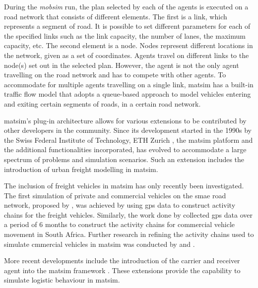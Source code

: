 During the \textit{mobsim} run, the plan selected by each of the agents is executed on a road network that consists of different elements. The first is a link, which represents a segment of road. It is possible to set different parameters for each of the specified links such as the link capacity, the number of lanes, the maximum capacity, etc. The second element is a node. Nodes represent different locations in the network, given as a set of coordinates. Agents travel on different links to the node(s) set out in the selected plan. However, the agent is not the only agent travelling on the road network and has to compete with other agents. To accommodate for multiple agents travelling on a single link, \acrshort{matsim} has a built-in traffic flow model that adopts a queue-based approach to model vehicles entering and exiting certain segments of roads, in a certain road network.\par

\acrshort{matsim}'s plug-in architecture allows for various extensions to be contributed by other developers in the community. Since its development started in the 1990s by the Swiss Federal Institute of Technology, ETH Zurich \citep{horni2016multi}, the \acrshort{matsim} platform and the additional functionalities incorporated, has evolved to accommodate a large spectrum of problems and simulation scenarios. Such an extension includes the introduction of urban freight modelling in \acrshort{matsim}.\par

The inclusion of freight vehicles in \acrshort{matsim} has only recently been investigated. The first simulation of private and commercial vehicles on the smae road network, proposed by \citet{joubert2010large}, was achieved by using \acrfull{gps} data to construct activity chains for the freight vehicles. Similarly, the work done by \citet{joubert2011inferring} collected \acrshort{gps} data over a period of 6 months to construct the activity chains for commercial vehicle movement in South Africa. Further research in refining the activity chains used to simulate cmmercial vehicles in \acrshort{matsim} was conducted by \citet{van2014generating} and \citet{joubert2016freight}.\par

More recent developments include the introduction of the carrier and receiver agent into the \acrshort{matsim} framework \citep{schroeder2012towards, bean2020behavioural}. These extensions provide the capability to simulate logistic behaviour in \acrshort{matsim}. 

